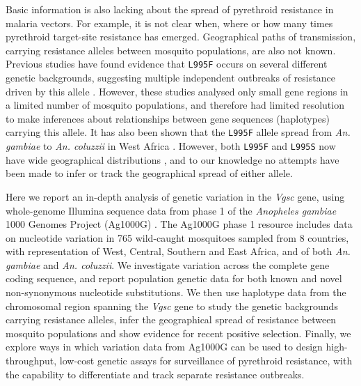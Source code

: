 \documentclass[a4paper,11pt,abstracton,hidelinks]{scrartcl}
\begin{document}
Basic information is also lacking about the spread of pyrethroid resistance in malaria vectors.
%
For example, it is not clear when, where or how many times pyrethroid target-site resistance has emerged.
%
Geographical paths of transmission, carrying resistance alleles between mosquito populations, are also not known.
%
Previous studies have found evidence that \texttt{L995F} occurs on several different genetic backgrounds, suggesting multiple independent outbreaks of resistance driven by this allele \cite{Pinto2007,Etang2009,Lynd2010,Santolamazza2015}.
%
However, these studies analysed only small gene regions in a limited number of mosquito populations, and therefore had limited resolution to make inferences about relationships between gene sequences (haplotypes) carrying this allele.
%
It has also been shown that the \texttt{L995F} allele spread from \textit{An. gambiae} to \textit{An. coluzzii} in West Africa \cite{Clarkson2014,Norris2015}.
%
However, both \texttt{L995F} and \texttt{L995S} now have wide geographical distributions \cite{Silva2014}, and to our knowledge no attempts have been made to infer or track the geographical spread of either allele.

Here we report an in-depth analysis of genetic variation in the \textit{Vgsc} gene, using whole-genome Illumina sequence data from phase 1 of the \emph{Anopheles gambiae} 1000 Genomes Project (Ag1000G) \cite{Ag1000gConsortium2017}.
%
The Ag1000G phase 1 resource includes data on nucleotide variation in 765 wild-caught mosquitoes sampled from 8 countries, with representation of West, Central, Southern and East Africa, and of both \textit{An. gambiae} and \textit{An. coluzzii}.
%
We investigate variation across the complete gene coding sequence, and report population genetic data for both known and novel non-synonymous nucleotide substitutions.
%
We then use haplotype data from the chromosomal region spanning the \textit{Vgsc} gene to study the genetic backgrounds carrying resistance alleles, infer the geographical spread of resistance between mosquito populations and show evidence for recent positive selection.
%
Finally, we explore ways in which variation data from Ag1000G can be used to design high-throughput, low-cost genetic assays for surveillance of pyrethroid resistance, with the capability to differentiate and track separate resistance outbreaks.


\end{document}
